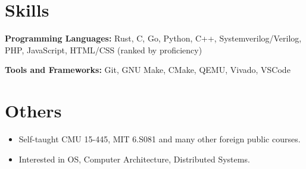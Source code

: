 \documentclass{resume}
\begin{document}




\section{Skills}
\textbf{Programming Languages:} \small Rust, C, Go, Python, C++, Systemverilog/Verilog, PHP, JavaScript, HTML/CSS (ranked by proficiency)

\textbf{Tools and Frameworks:} \small Git, GNU Make, CMake, QEMU, Vivado, VSCode

\section{Others}
\begin{itemize}
  \item Self-taught CMU 15-445, MIT 6.S081 and many other foreign public courses.
  \item Interested in OS, Computer Architecture, Distributed Systems.
\end{itemize}
\end{document}
